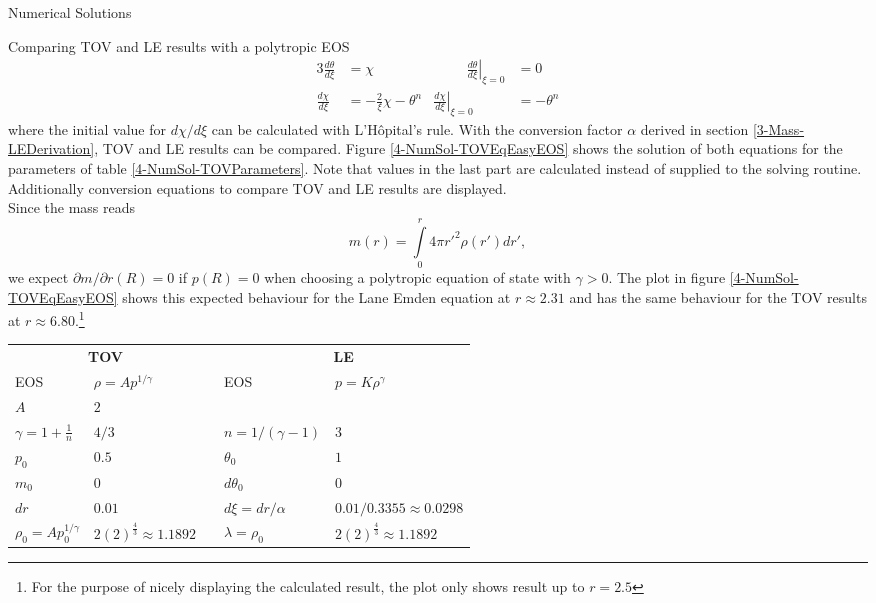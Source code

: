 \begin{section}{Numerical Solutions}
\begin{subsection}{Comparing TOV and LE results with a polytropic EOS}
\begin{alignat}{3}
	\frac{d\theta}{d\xi} &= \chi &\hspace{1cm} \left.\frac{d\theta}{d\xi}\right|_{\xi=0} &= 0\\
	\frac{d\chi}{d\xi} &= -\frac{2}{\xi}\chi-\theta^n & \left.\frac{d\chi}{d\xi}\right|_{\xi=0} &= -\theta^n
	\label{4-NumSol-LE-Substitution}
\end{alignat}
where the initial value for $d\chi/d\xi$ can be calculated with L'Hôpital's rule. With the conversion factor $\alpha$ derived in section \ref{3-Mass-LEDerivation}, \ac{TOV} and \ac{LE} results can be compared. Figure \ref{4-NumSol-TOVEqEasyEOS} shows the solution of both equations for the parameters of table \ref{4-NumSol-TOVParameters}. Note that values in the last part are calculated instead of supplied to the solving routine. Additionally conversion equations to compare \ac{TOV} and \ac{LE} results are displayed.\\
Since the mass reads
\begin{equation}
	m(r) = \int\limits_0^r 4\pi r'^2\rho(r')dr',
\end{equation}
we expect $\partial m/\partial r(R)=0$ if $p(R)=0$ when choosing a polytropic equation of state with $\gamma>0$. The plot in figure \ref{4-NumSol-TOVEqEasyEOS} shows this expected behaviour for the Lane Emden equation at $r\approx2.31$ and has the same behaviour for the \ac{TOV} results at $r\approx6.80$.\footnote{For the purpose of nicely displaying the calculated result, the plot only shows result up to $r=2.5$}
\begin{table}[H]
	\renewcommand{\arraystretch}{1.2}
	\centering
	\begin{tabular}{@{}llcll@{}}
		\toprule
		\multicolumn{2}{c}{\textbf{TOV}} & \phantom{abc} &\multicolumn{2}{c}{\textbf{LE}}\\
		\cmidrule{1-2} \cmidrule{4-5}
		EOS & $\rho=Ap^{1/\gamma}$ && EOS & $p=K\rho^{\gamma}$\\
		$A$ & $2$ & & \\
		$\gamma=1+\frac{1}{n}$ & $4/3$ && $n=1/(\gamma-1)$ & $3$\\
		$p_0$ & $0.5$ && $\theta_0$ & $1$\\
		$m_0$ & $0$ && $d\theta_0$ & $0$\\
		$dr$ & $0.01$ && $d\xi=dr/\alpha$ & $0.01/0.3355\approx0.0298$\\
		\cmidrule{1-2} \cmidrule{4-5}
		$\rho_0=Ap_0^{1/\gamma}$ & $2(2)^{\frac{4}{3}}\approx1.1892$ && $\lambda=\rho_0$ & $2(2)^{\frac{4}{3}}\approx1.1892$\\

\end{tabular}
\end{table}
\end{subsection}
\end{section}
